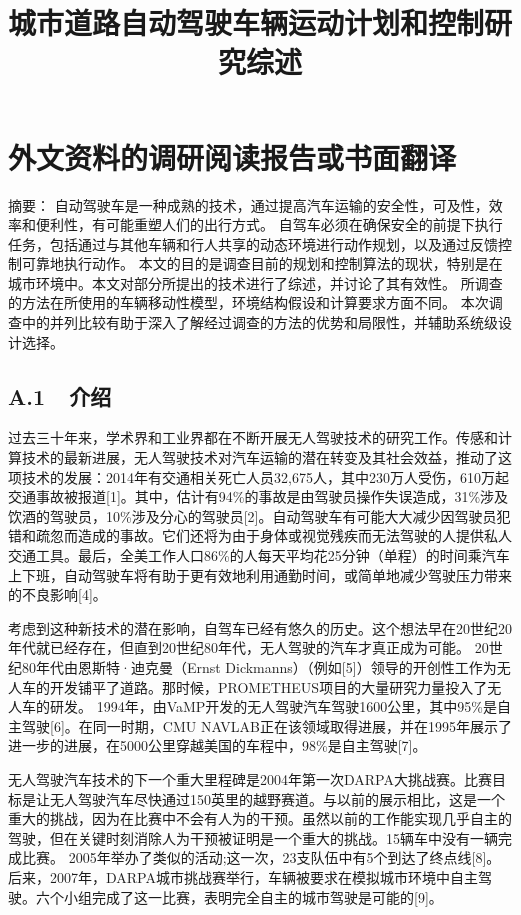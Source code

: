 \chapter{外文资料的调研阅读报告或书面翻译}

\title{城市道路自动驾驶车辆运动计划和控制研究综述}

{\heiti 摘要：} 自动驾驶车是一种成熟的技术，通过提高汽车运输的安全性，可及性，效率和便利性，有可能重塑人们的出行方式。 自驾车必须在确保安全的前提下执行任务，包括通过与其他车辆和行人共享的动态环境进行动作规划，以及通过反馈控制可靠地执行动作。 本文的目的是调查目前的规划和控制算法的现状，特别是在城市环境中。本文对部分所提出的技术进行了综述，并讨论了其有效性。 所调查的方法在所使用的车辆移动性模型，环境结构假设和计算要求方面不同。 本次调查中的并列比较有助于深入了解经过调查的方法的优势和局限性，并辅助系统级设计选择。

\section*{A.1\ \ 介绍}

过去三十年来，学术界和工业界都在不断开展无人驾驶技术的研究工作。传感和计算技术的最新进展，无人驾驶技术对汽车运输的潜在转变及其社会效益，推动了这项技术的发展：2014年有交通相关死亡人员32,675人，其中230万人受伤，610万起交通事故被报道[1]。其中，估计有94\%的事故是由驾驶员操作失误造成，31\%涉及饮酒的驾驶员，10\%涉及分心的驾驶员[2]。自动驾驶车有可能大大减少因驾驶员犯错和疏忽而造成的事故。它们还将为由于身体或视觉残疾而无法驾驶的人提供私人交通工具。最后，全美工作人口86\%的人每天平均花25分钟（单程）的时间乘汽车上下班，自动驾驶车将有助于更有效地利用通勤时间，或简单地减少驾驶压力带来的不良影响[4]。

考虑到这种新技术的潜在影响，自驾车已经有悠久的历史。这个想法早在20世纪20年代就已经存在，但直到20世纪80年代，无人驾驶的汽车才真正成为可能。 20世纪80年代由恩斯特·迪克曼（Ernst Dickmanns）（例如[5]）领导的开创性工作为无人车的开发铺平了道路。那时候，PROMETHEUS项目的大量研究力量投入了无人车的研发。 1994年，由VaMP开发的无人驾驶汽车驾驶1600公里，其中95\%是自主驾驶[6]。在同一时期，CMU NAVLAB正在该领域取得进展，并在1995年展示了进一步的进展，在5000公里穿越美国的车程中，98\%是自主驾驶[7]。

无人驾驶汽车技术的下一个重大里程碑是2004年第一次DARPA大挑战赛。比赛目标是让无人驾驶汽车尽快通过150英里的越野赛道。与以前的展示相比，这是一个重大的挑战，因为在比赛中不会有人为的干预。虽然以前的工作能实现几乎自主的驾驶，但在关键时刻消除人为干预被证明是一个重大的挑战。15辆车中没有一辆完成比赛。 2005年举办了类似的活动;这一次，23支队伍中有5个到达了终点线[8]。后来，2007年，DARPA城市挑战赛举行，车辆被要求在模拟城市环境中自主驾驶。六个小组完成了这一比赛，表明完全自主的城市驾驶是可能的[9]。

